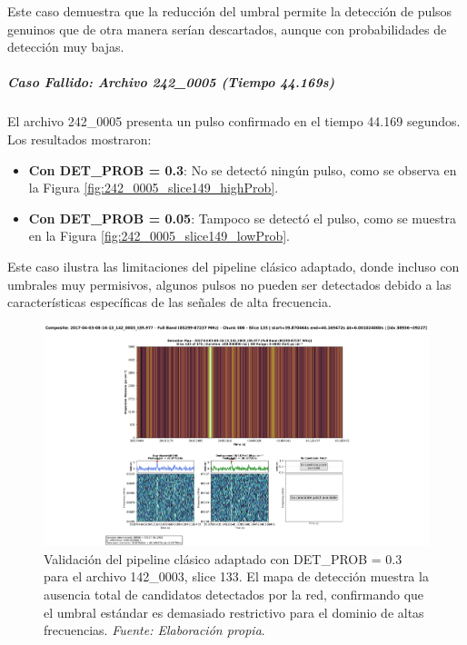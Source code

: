 Este caso demuestra que la reducción del umbral permite la detección de pulsos genuinos que de otra manera serían descartados, aunque con probabilidades de detección muy bajas.

\subparagraph{Caso Fallido: Archivo 242\_0005 (Tiempo 44.169s)}

El archivo 242\_0005 presenta un pulso confirmado en el tiempo 44.169 segundos. Los resultados mostraron:

\begin{itemize}
    \item \textbf{Con DET\_PROB = 0.3}: No se detectó ningún pulso, como se observa en la Figura \ref{fig:242_0005_slice149_highProb}.
    \item \textbf{Con DET\_PROB = 0.05}: Tampoco se detectó el pulso, como se muestra en la Figura \ref{fig:242_0005_slice149_lowProb}.
\end{itemize}

Este caso ilustra las limitaciones del pipeline clásico adaptado, donde incluso con umbrales muy permisivos, algunos pulsos no pueden ser detectados debido a las características específicas de las señales de alta frecuencia.

\begin{figure}[H]
    \centering
    \includegraphics[width=\textwidth]{figures/2017-04-03-08-16-13_142_0003_t39.977_slice133.png}
    \caption{Validación del pipeline clásico adaptado con DET\_PROB = 0.3 para el archivo 142\_0003, slice 133. El mapa de detección muestra la ausencia total de candidatos detectados por la red, confirmando que el umbral estándar es demasiado restrictivo para el dominio de altas frecuencias. \textit{Fuente: Elaboración propia}.}
    \label{fig:142_0003_slice133_highProb}
\end{figure}

